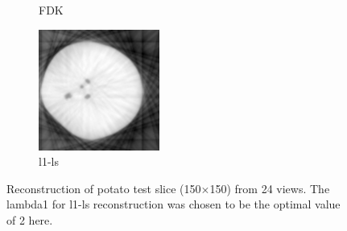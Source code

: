 \documentclass{article}
\begin{document}
\begin{figure}[!h]
\begin{subfigure}[b]{0.3\linewidth}
        \caption{FDK}
    \end{subfigure}
    \begin{subfigure}[b]{0.3\linewidth}
        \includegraphics[width=\textwidth]{../images/potato/2D/cs_blurred_results/24_views/result_CS_lambda0_2.00.png}
        \caption{l1-ls}
    \end{subfigure}
     \caption{Reconstruction of potato test slice (150$\times$150) from 24 views. The lambda1 for l1-ls reconstruction was chosen to be the optimal value of 2 here.} 
\label{fig:cs_blurred_24_views}
\end{figure}
\end{document}
